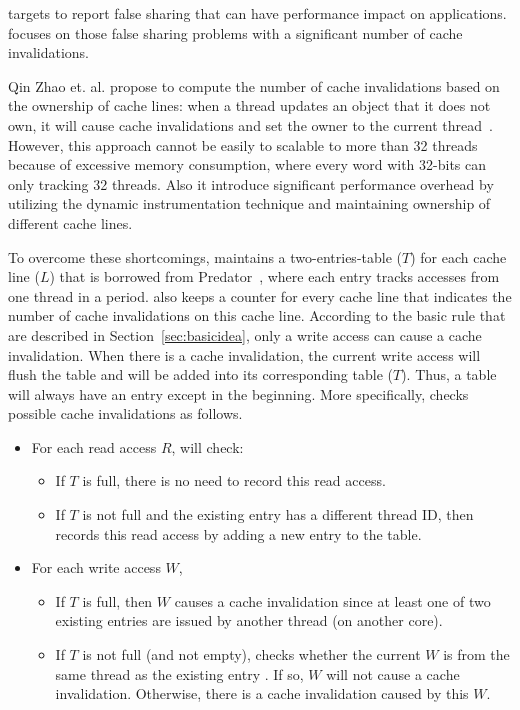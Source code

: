 \Cheetah{} targets to report false sharing that can have performance impact on applications. \Cheetah{} focuses on those false sharing problems with a significant number of cache invalidations.  

Qin Zhao et. al. propose to compute the number of cache invalidations based on the ownership of cache lines: when a thread updates an object that it does not own, it will cause cache invalidations and set the owner to the current thread~\cite{qinzhao}. However, this approach cannot be easily to scalable to more than 32 threads because of excessive memory consumption, where every word with 32-bits can only tracking 32 threads. Also it introduce significant performance overhead by utilizing the dynamic instrumentation technique and maintaining ownership of different cache lines. 

To overcome these shortcomings, \Cheetah{} maintains a two-entries-table ($T$) for each cache line ($L$) that is borrowed from Predator~\cite{Predator}, where each entry tracks accesses from one thread in a period. \Cheetah{} also keeps a counter for every cache line that indicates the number of cache invalidations on this cache line.  
According to the basic rule that are described in Section~\ref{sec:basicidea}, only a write access can cause a cache invalidation. When there is a cache invalidation, the current write access will flush the table and will be added into its corresponding table ($T$). Thus, a table will always have an entry except in the beginning. More specifically, \cheetah{} checks possible cache invalidations as follows.
 
\begin{itemize}
\item
  For each read access $R$, \cheetah{} will check: 
  \begin{itemize}
    \item
      If $T$ is full, there is no need to record this read access.
    \item
      If $T$ is not full and the existing entry has a different thread ID, 
      then \cheetah{} records this read access by adding a new entry to the table.
  \end{itemize}
\item
  For each write access $W$,  
  \begin{itemize}
    \item
      If $T$ is full, then $W$ causes a cache invalidation since at least one of two existing entries are issued by another thread (on another core).
    \item
      If $T$ is not full (and not empty),
      \cheetah{} checks whether the current $W$ is from the same thread as the existing entry . If
      so, $W$ will not cause a cache invalidation. Otherwise, there is a cache invalidation caused by this $W$.
  \end{itemize}
\end{itemize}

